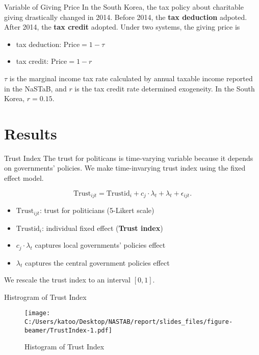\documentclass[
  ignorenonframetext,
]{beamer}
\providecommand{\tightlist}{%
  \setlength{\itemsep}{0pt}\setlength{\parskip}{0pt}}
\begin{document}
\begin{frame}{Variable of Giving Price}
\protect\hypertarget{variable-of-giving-price}{}
In the South Korea, the tax policy about charitable giving drastically
changed in 2014. Before 2014, the \textbf{tax deduction} adpoted. After
2014, the \textbf{tax credit} adopted. Under two systems, the giving
price is

\begin{itemize}
\tightlist
\item
  tax deduction: \(\text{Price} = 1 - \tau\)
\item
  tax credit: \(\text{Price} = 1 - r\)
\end{itemize}

\(\tau\) is the marginal income tax rate calculated by annual taxable
income reported in the NaSTaB, and \(r\) is the tax credit rate
determined exogeneity. In the South Korea, \(r = 0.15\).
\end{frame}

\hypertarget{results}{%
\section{Results}\label{results}}

\begin{frame}{Trust Index}
\protect\hypertarget{trust-index}{}
The trust for politicans is time-varying variable because it depends on
governments' policies. We make time-invarying trust index using the
fixed effect model.

\[
    \text{Trust}_{ijt} = \text{Trustid}_i + c_j \cdot \lambda_t + \lambda_t + \epsilon_{ijt}.
\]

\begin{itemize}
\tightlist
\item
  \(\text{Trust}_{ijt}\): trust for politicians (5-Likert scale)
\item
  \(\text{Trustid}_i\): individual fixed effect (\textbf{Trust index})
\item
  \(c_j \cdot \lambda_t\) captures local governments' policies effect
\item
  \(\lambda_t\) captures the central government policies effect
\end{itemize}

We rescale the trust index to an interval \([0,1]\).
\end{frame}

\begin{frame}{Histrogram of Trust Index}
\protect\hypertarget{histrogram-of-trust-index}{}
\begin{figure}
\centering
\texttt{[image: C:/Users/katoo/Desktop/NASTAB/report/slides\_files/figure-beamer/TrustIndex-1.pdf]}
\caption{Histogram of Trust Index}
\end{figure}
\end{frame}
\end{document}
